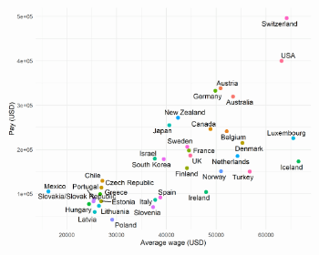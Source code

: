 \documentclass[11pt, letterpaper, twoside]{article}
\begin{document}
\begin{figure}
    \centering
    \includegraphics[clip, width=0.8\textwidth]{figures/leader_pay.png}
\end{figure}





\nocite{bell2016rulers}
\newpage


\newpage
\end{document}
